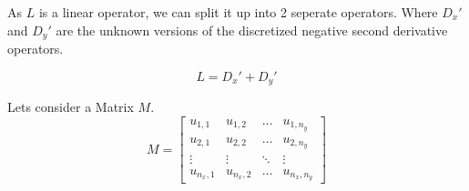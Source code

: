 \documentclass{article}
\begin{document}
As $L$ is a linear operator, we can split it up into 2 seperate operators. Where $D_x'$ and $D_y'$ are the unknown versions of the discretized negative second derivative operators.

\begin{equation}
    L = D_x' + D_y'
\end{equation}

Lets consider a Matrix $M$.
\begin{equation}
    M = \begin{bmatrix}
        u_{1,1} & u_{1,2} & \dots & u_{1,n_y} \\
        u_{2,1} & u_{2,2} & \dots & u_{2,n_y} \\
        \vdots & \vdots & \ddots & \vdots \\
        u_{n_x,1} & u_{n_x,2} & \dots & u_{n_x,n_y}
    \end{bmatrix}
\end{equation}
\end{document}
